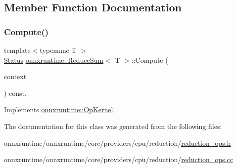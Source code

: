 \subsection{Member Function Documentation}
\mbox{\label{classonnxruntime_1_1ReduceSum_a743af6e8784f94fe032a68ef10de3a41}} 
\subsubsection{\texorpdfstring{Compute()}{Compute()}}
{\footnotesize\ttfamily template$<$typename T $>$ \\
\mbox{\hyperlink{classonnxruntime_1_1common_1_1Status}{Status}} \mbox{\hyperlink{classonnxruntime_1_1ReduceSum}{onnxruntime\+::\+Reduce\+Sum}}$<$ T $>$\+::Compute (\begin{DoxyParamCaption}\item[{\mbox{\hyperlink{classonnxruntime_1_1OpKernelContext}{Op\+Kernel\+Context}} $\ast$}]{context }\end{DoxyParamCaption}) const\hspace{0.3cm}{\ttfamily [override]}, {\ttfamily [virtual]}}



Implements \mbox{\hyperlink{classonnxruntime_1_1OpKernel_a9eca8656a78b1b3ab9d3351a12798650}{onnxruntime\+::\+Op\+Kernel}}.



The documentation for this class was generated from the following files\+:\begin{DoxyCompactItemize}
\item 
onnxruntime/onnxruntime/core/providers/cpu/reduction/\mbox{\hyperlink{cpu_2reduction_2reduction__ops_8h}{reduction\+\_\+ops.\+h}}\item 
onnxruntime/onnxruntime/core/providers/cpu/reduction/\mbox{\hyperlink{cpu_2reduction_2reduction__ops_8cc}{reduction\+\_\+ops.\+cc}}\end{DoxyCompactItemize}
